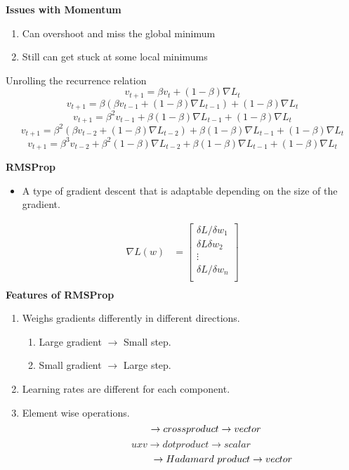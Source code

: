     \textbf{Issues with Momentum}
    \begin{enumerate}
        \item Can overshoot and miss the global minimum
        \item Still can get stuck at some local minimums
    \end{enumerate}
    Unrolling the recurrence relation
    \[
    v_{t+1} = \beta v_t+(1-\beta)\nabla L_t
    \]
    \[
    v_{t+1} = \beta (\beta v_{t-1} +(1-\beta)\nabla L_{t-1})+(1-\beta)\nabla L_t
    \]
    \[
    v_{t+1}=\beta^2v_{t-1}+\beta(1-\beta)\nabla L_{t-1} +(1-\beta)\nabla L_t
    \]
    \[
    v_{t+1}=\beta^2(\beta v_{t-2}+(1-\beta)\nabla L_{t-2})+\beta(1-\beta)\nabla L_{t-1}+(1-\beta)\nabla L_t
    \]
    \[
    v_{t+1}=\beta^3v_{t-2}+\beta^2(1-\beta)\nabla L_{t-2}+\beta(1-\beta)\nabla L_{t-1}+(1-\beta)\nabla L_t
    \]
    \item \textbf{RMSProp}
    \begin{itemize}
        \item A type of gradient descent that is adaptable depending on the size of the gradient.
    \end{itemize}
    \begin{align*}
    \nabla L(w) &= \begin{bmatrix}
           \delta L/\delta w_1    \\
           \delta L\delta w_2    \\
           \vdots   \\
           \delta L/\delta w_n    \\
         \end{bmatrix} \\
    \end{align*}
    \textbf{Features of RMSProp}
    \begin{enumerate}
        \item Weighs gradients differently in different directions.
        \begin{enumerate}
            \item Large gradient $\rightarrow$ Small step.
            \item Small gradient $\rightarrow$ Large step.
        \end{enumerate}
        \item Learning rates are different for each component.
        \item Element wise operations.
        \[
        \hspace{1.1cm} \rightarrow cross product \rightarrow vector
        \]
        \[
        uxv \rightarrow dot product \rightarrow scalar
        \]
        \[
        \hspace{2.3cm} \rightarrow Hadamard\ product \rightarrow vector
        \]
    \end{enumerate}
